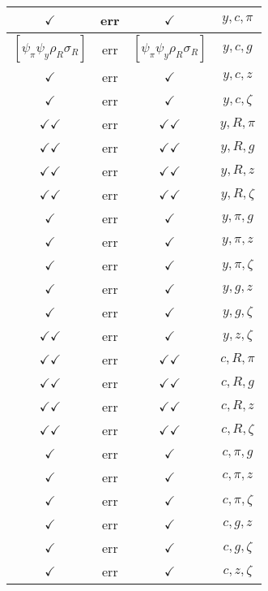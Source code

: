 \documentclass[a4paper,10pt]{article}
\begin{document}
\begin{longtable}{|c|c|c|c|}
\hline
$\checkmark$ & err & $\checkmark$ & ${y},{c},{\pi}$ \\
\hline
$[\psi_\pi \psi_y \rho_R \sigma_R ]$ & err & $[\psi_\pi \psi_y \rho_R \sigma_R ]$ & ${y},{c},{g}$ \\
\hline
$\checkmark$ & err & $\checkmark$ & ${y},{c},{z}$ \\
\hline
$\checkmark$ & err & $\checkmark$ & ${y},{c},{\zeta}$ \\
\hline
$\checkmark\checkmark$ & err & $\checkmark\checkmark$ & ${y},{R},{\pi}$ \\
\hline
$\checkmark\checkmark$ & err & $\checkmark\checkmark$ & ${y},{R},{g}$ \\
\hline
$\checkmark\checkmark$ & err & $\checkmark\checkmark$ & ${y},{R},{z}$ \\
\hline
$\checkmark\checkmark$ & err & $\checkmark\checkmark$ & ${y},{R},{\zeta}$ \\
\hline
$\checkmark$ & err & $\checkmark$ & ${y},{\pi},{g}$ \\
\hline
$\checkmark$ & err & $\checkmark$ & ${y},{\pi},{z}$ \\
\hline
$\checkmark$ & err & $\checkmark$ & ${y},{\pi},{\zeta}$ \\
\hline
$\checkmark$ & err & $\checkmark$ & ${y},{g},{z}$ \\
\hline
$\checkmark$ & err & $\checkmark$ & ${y},{g},{\zeta}$ \\
\hline
$\checkmark\checkmark$ & err & $\checkmark$ & ${y},{z},{\zeta}$ \\
\hline
$\checkmark\checkmark$ & err & $\checkmark\checkmark$ & ${c},{R},{\pi}$ \\
\hline
$\checkmark\checkmark$ & err & $\checkmark\checkmark$ & ${c},{R},{g}$ \\
\hline
$\checkmark\checkmark$ & err & $\checkmark\checkmark$ & ${c},{R},{z}$ \\
\hline
$\checkmark\checkmark$ & err & $\checkmark\checkmark$ & ${c},{R},{\zeta}$ \\
\hline
$\checkmark$ & err & $\checkmark$ & ${c},{\pi},{g}$ \\
\hline
$\checkmark$ & err & $\checkmark$ & ${c},{\pi},{z}$ \\
\hline
$\checkmark$ & err & $\checkmark$ & ${c},{\pi},{\zeta}$ \\
\hline
$\checkmark$ & err & $\checkmark$ & ${c},{g},{z}$ \\
\hline
$\checkmark$ & err & $\checkmark$ & ${c},{g},{\zeta}$ \\
\hline
$\checkmark$ & err & $\checkmark$ & ${c},{z},{\zeta}$ \\

\end{longtable}
\end{document}
